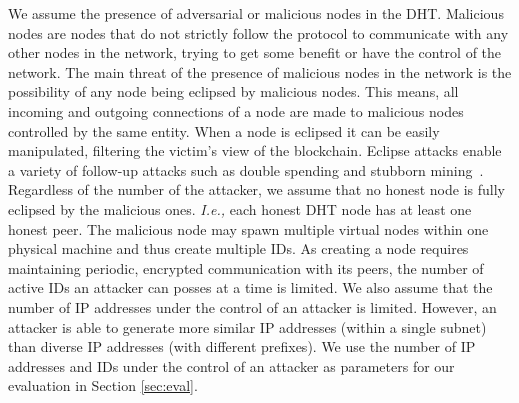 We assume the presence of adversarial or malicious nodes in the DHT. 
Malicious nodes are nodes that do not strictly follow the protocol to communicate with any other nodes in the network,  trying to get some benefit or have the control of the network.
The main threat of the presence of malicious nodes in the network is the possibility of any node being eclipsed by malicious nodes.
This means,  all incoming and outgoing connections of a node are made to malicious nodes controlled by the same entity. 
When a node is eclipsed it can be easily manipulated,
filtering the victim’s view of the blockchain.  
Eclipse attacks
enable a variety of follow-up attacks such as double spending
and stubborn mining~\cite{stubborn}.
Regardless of the number of the attacker, we assume that no honest node is fully eclipsed by the malicious ones. \textit{I.e.,} each honest DHT node has at least one honest peer.  
The malicious node may spawn multiple virtual nodes within one physical machine and thus create multiple IDs. 
As creating a node requires maintaining periodic, encrypted communication with its peers, the number of active IDs an attacker can posses at a time is limited. 
We also assume that the number of IP addresses under the control of an attacker is limited. 
However, an attacker is able to generate more similar IP addresses (within a single subnet) than diverse IP addresses (with different prefixes). 
We use the number of IP addresses and IDs under the control of an attacker as parameters for our evaluation in Section \ref{sec:eval}.


